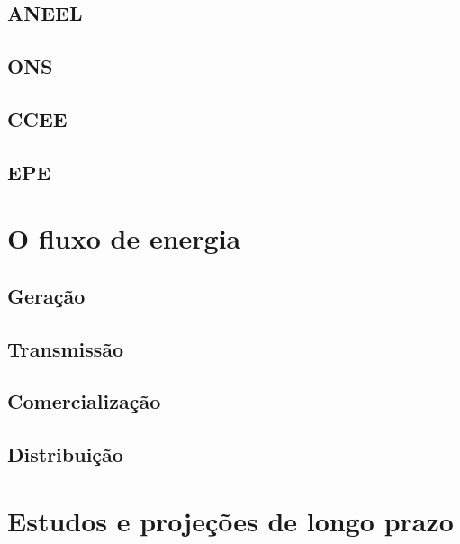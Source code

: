 \documentclass[grad,numbers]{coppe}
\begin{document}
  \hypertarget{aneel}{%
  \subsection{ANEEL}\label{aneel}}
  
  \hypertarget{ons}{%
  \subsection{ONS}\label{ons}}
  
  \hypertarget{ccee}{%
  \subsection{CCEE}\label{ccee}}
  
  \hypertarget{epe}{%
  \subsection{EPE}\label{epe}}
  
  \hypertarget{o-fluxo-de-energia}{%
  \section{O fluxo de energia}\label{o-fluxo-de-energia}}
  
  \hypertarget{gerauxe7uxe3o}{%
  \subsection{Geração}\label{gerauxe7uxe3o}}
  
  \hypertarget{transmissuxe3o}{%
  \subsection{Transmissão}\label{transmissuxe3o}}
  
  \hypertarget{comercializauxe7uxe3o}{%
  \subsection{Comercialização}\label{comercializauxe7uxe3o}}
  
  \hypertarget{distribuiuxe7uxe3o}{%
  \subsection{Distribuição}\label{distribuiuxe7uxe3o}}
  
  \hypertarget{estudos-e-projeuxe7uxf5es-de-longo-prazo}{%
  \section{Estudos e projeções de longo prazo}\label{estudos-e-projeuxe7uxf5es-de-longo-prazo}}
  
\end{document}
